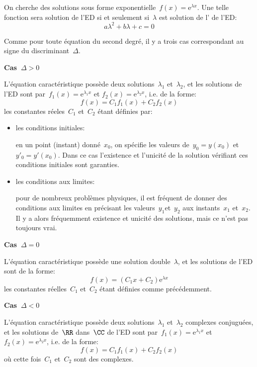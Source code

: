 On cherche des solutions sous forme exponentielle~$f(x) = \mathrm{e}^{\lambda x}$. 
Une telle fonction sera solution de l'ED si et seulement si~$\lambda$ est solution de
l' de l'ED:
\begin{equation}
  a\lambda^2 + b\lambda + c = 0
\end{equation}

Comme pour toute équation du second degré, il y a trois cas correspondant au signe du
discriminant~$\Delta$.

\medskip
\textbf{Cas~$\Delta>0$}

L'équation caractéristique possède deux solutions~$\lambda_1$ et~$\lambda_2$, et
les solutions de l'ED sont  par~$f_1(x) = \mathrm{e}^{\lambda_1x}$ et
$f_2(x) = \mathrm{e}^{\lambda_2x}$, i.e. de la forme:
\begin{equation}
f(x) = C_1f_1(x) + C_2f_2(x) 
\end{equation}
les constantes réeles~$C_1$ et~$C_2$ étant définies par:
\begin{itemize}
  \item les conditions initiales: 

	en un point (instant) donné~$x_0$, on spécifie les valeurs de~$y_0=y(x_0)$ et~$y'_0=y'(x_0)$. 
	Dans ce cas l'existence et l'unicité de la solution vérifiant ces conditions initiales sont garanties.
  \item les conditions aux limites:

	pour de nombreux problèmes physiques, il est fréquent de donner des conditions aux limites en 
	précisant les valeurs~$y_1$et~$y_2$ aux instants~$x_1$ et~$x_2$. 
	Il y a alors fréquemment existence et unicité des solutions, mais ce n'est pas toujours vrai.
\end{itemize}

\medskip
\textbf{Cas~$\Delta=0$}

L'équation caractéristique possède une solution double~$\lambda$, et
les solutions de l'ED sont de la forme:
\begin{equation}
f(x) = (C_1 x + C_2)\mathrm{e}^{\lambda x}
\end{equation}
les constantes réelles~$C_1$ et~$C_2$ étant définies comme précédemment.

\medskip
\textbf{Cas~$\Delta<0$}

L'équation caractéristique possède deux solutions~$\lambda_1$ et~$\lambda_2$
complexes conjuguées, et les solutions de~$\RR$ dans~$\CC$ de l'ED sont 
 par~$f_1(x) = \mathrm{e}^{\lambda_1x}$ et
$f_2(x) = \mathrm{e}^{\lambda_2x}$, i.e. de la forme:
\begin{equation}
f(x) = C_1f_1(x) + C_2f_2(x) 
\end{equation}
où cette fois~$C_1$ et~$C_2$ sont des complexes.

